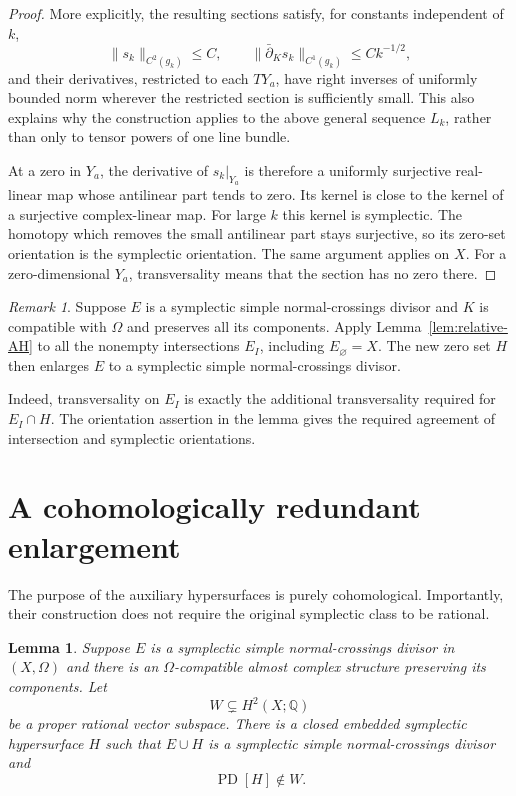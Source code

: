 \documentclass[11pt]{amsart}
\newtheorem{lemma}[theorem]{Lemma}
\theoremstyle{definition}
\theoremstyle{remark}
\newtheorem{remark}[theorem]{Remark}
\newcommand{\Q}{\mathbb Q}
\newcommand{\PD}{\operatorname{PD}}
\begin{document}
\begin{proof}
More explicitly, the resulting sections satisfy, for constants
independent of $k$,
\[
\|s_k\|_{C^2(g_k)}\leq C,\qquad
\|\bar\partial_Ks_k\|_{C^1(g_k)}\leq Ck^{-1/2},
\]
and their derivatives, restricted to each $TY_a$, have right
inverses of uniformly bounded norm wherever the restricted
section is sufficiently small.  This also explains why the
construction applies to the above general sequence $L_k$, rather
than only to tensor powers of one line bundle.

At a zero in $Y_a$, the derivative of $s_k|_{Y_a}$ is therefore
a uniformly surjective real-linear map whose antilinear part
tends to zero.  Its kernel is close to the kernel of a surjective
complex-linear map.  For large $k$ this kernel is symplectic.
The homotopy which removes the small antilinear part stays
surjective, so its zero-set orientation is the symplectic
orientation.  The same argument applies on $X$.  For a
zero-dimensional $Y_a$, transversality means that the section
has no zero there.
\end{proof}

\begin{remark}\label{rem:relative-SNC}
Suppose $E$ is a symplectic simple normal-crossings divisor and
$K$ is compatible with $\Omega$ and preserves all its components.
Apply Lemma~\ref{lem:relative-AH} to all the nonempty intersections
$E_I$, including $E_\varnothing=X$.  The new zero set $H$
then enlarges $E$ to a symplectic simple normal-crossings divisor.

Indeed, transversality on $E_I$ is exactly the additional
transversality required for $E_I\cap H$.  The orientation assertion
in the lemma gives the required agreement of intersection and
symplectic orientations.
\end{remark}

\section{A cohomologically redundant enlargement}

The purpose of the auxiliary hypersurfaces is purely
cohomological.  Importantly, their construction does not require
the original symplectic class to be rational.

\begin{lemma}\label{lem:outside-subspace}
Suppose $E$ is a symplectic simple normal-crossings divisor in
$(X,\Omega)$ and there is an $\Omega$-compatible almost complex
structure preserving its components.  Let
\[
W\subsetneq H^2(X;\Q)
\]
be a proper rational vector subspace.  There is a closed embedded
symplectic hypersurface $H$ such that $E\cup H$ is a symplectic
simple normal-crossings divisor and
\[
\PD[H]\notin W.
\]
\end{lemma}
\end{document}
